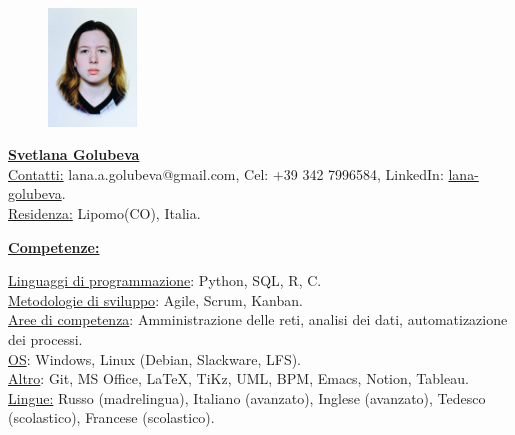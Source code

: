 \documentclass[a4paper,10pt,fullpage]{article}
\begin{document}


\begin{figure}
	\includegraphics[width=0.21\textwidth]{photo1}
\end{figure}

\underline{\textbf{\LARGE Svetlana Golubeva}}\\

\underline{Contatti:} lana.a.golubeva@gmail.com, Cel: +39 342 7996584, LinkedIn: \href{https://www.linkedin.com/in/lana-golubeva/}{lana-golubeva}. \\
\underline{Residenza:} Lipomo(CO), Italia. %



\begin{center}
	\underline{\textbf{\large Competenze:}}
\end{center}
\underline{Linguaggi di programmazione}: Python, SQL, R, C.\\
\underline{Metodologie di sviluppo}: Agile, Scrum, Kanban.\\
\underline{Aree di competenza}: Amministrazione delle reti, analisi dei dati, automatizazione dei processi.\\
\underline{OS}: Windows, Linux (Debian, Slackware, LFS).\\
\underline{Altro}: Git, MS Office, \LaTeX, TiKz, UML, BPM, Emacs, Notion, Tableau.\\
\underline{Lingue:} Russo (madrelingua), Italiano (avanzato), Inglese (avanzato), Tedesco (scolastico), Francese (scolastico).%
\end{document}
